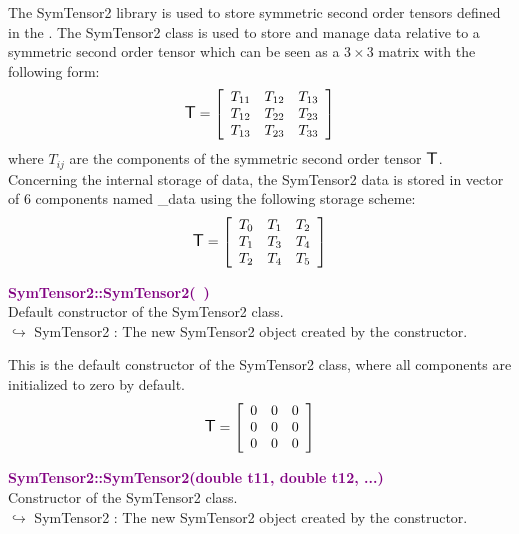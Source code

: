 The SymTensor2 library is used to store symmetric second order tensors defined in the \DynELA.
The SymTensor2 class is used to store and manage data relative to a symmetric second order tensor which can be seen as a $3\times3$ matrix with the following form:
\begin{equation*}
\mbox{\large\ensuremath{\mathsf{T}}}=\left[\begin{array}{ccc}
  T_{11} & T_{12} & T_{13}\\
  T_{12} & T_{22} & T_{23}\\
  T_{13} & T_{23} & T_{33}
  \end{array}\right]
\end{equation*}
where $T_{ij}$ are the components of the symmetric second order tensor $\mbox{\large\ensuremath{\mathsf{T}}}$.
Concerning the internal storage of data, the SymTensor2 data is stored in vector of $6$ components named \textsf{\_data} using the following storage scheme:
\begin{equation*}
\mbox{\large\ensuremath{\mathsf{T}}}=\left[\begin{array}{ccc}
    T_{0} & T_{1} & T_{2}\\
    T_{1} & T_{3} & T_{4}\\
    T_{2} & T_{4} & T_{5}
    \end{array}\right]
\end{equation*}

\textcolor{purple}{\textbf{SymTensor2::SymTensor2(~)}}\label{SymTensor2::SymTensor2()}\\
Default constructor of the SymTensor2 class.\\ \hspace*{10mm}$\hookrightarrow$ SymTensor2 : The new SymTensor2 object created by the constructor.

This is the default constructor of the SymTensor2 class, where all components are initialized to zero by default.
\begin{equation*}
\mbox{\large\ensuremath{\mathsf{T}}}=\left[\begin{array}{ccc}
0 & 0 & 0\\
0 & 0 & 0\\
0 & 0 & 0
\end{array}\right]
\end{equation*}

\textcolor{purple}{\textbf{SymTensor2::SymTensor2(double t11, double t12, ...)}}\label{SymTensor2::SymTensor2(double t11, double t12, ...)}\\
Constructor of the SymTensor2 class.\\ \hspace*{10mm}$\hookrightarrow$ SymTensor2 : The new SymTensor2 object created by the constructor.

